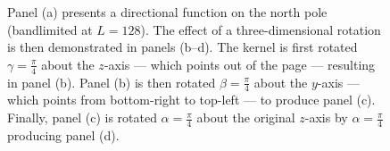 \begin{figure}[htpb]
	\caption[
		A demonstration of the three-dimensional rotation
	]{
		Panel (a) presents a directional function on the north pole (bandlimited at \(L=128\)).
		The effect of a three-dimensional rotation is then demonstrated in panels (b--d). %
		The kernel is first rotated \(\gamma=\frac{\pi}{4}\) about the \(z\)-axis --- which points out of the page --- resulting in panel (b).
		Panel (b) is then rotated \(\beta=\frac{\pi}{4}\) about the \(y\)-axis --- which points from bottom-right to top-left --- to produce panel (c).
		Finally, panel (c) is rotated \(\alpha=\frac{\pi}{4}\) about the original \(z\)-axis by \(\alpha=\frac{\pi}{4}\) producing panel (d).
	}\label{fig:chapter2_rotation_sphere}
\end{figure}
